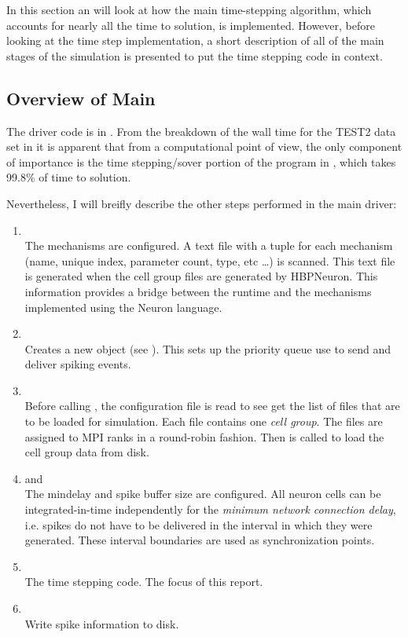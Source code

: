 In this section an will look at how the main time-stepping algorithm, which accounts for nearly all the time to solution, is implemented. However, before looking at the time step implementation, a short description of all of the main stages of the simulation is presented to put the time stepping code in context.
\subsection{Overview of Main}
The driver code is in . From the breakdown of the wall time for the TEST2 data set in  it is apparent that from a computational point of view, the only component of importance is the time stepping/sover portion of the program in , which takes 99.8\% of time to solution.

Nevertheless, I will breifly describe the other steps performed in the main driver:
\begin{enumerate}
\item {}\\
The mechanisms are configured. A text file with a tuple for each mechanism (name, unique index, parameter count, type,  etc \dots) is scanned. This text file is generated when the cell group files are generated by HBPNeuron. This information provides a bridge between the runtime and the mechanisms implemented using the Neuron \hoc language.
\item {}\\
    Creates a new  object (see ). This sets up the priority queue use to send and deliver spiking events.
\item {}\\
    Before calling , the configuration file  is read to see get the list of files that are to be loaded for simulation. Each file contains one \emph{cell group}. The files are assigned to MPI ranks in a round-robin fashion. Then  is called to load the cell group data from disk.
\item {} and \\
    The mindelay and spike buffer size are configured. All neuron cells can be integrated-in-time independently for the \emph{minimum network connection delay}, i.e. spikes do not have to be delivered in the interval in which they were generated. These interval boundaries are used as synchronization points.
\item {} \\
    The time stepping code. The focus of this report.
\item {} \\
    Write spike information to disk.
\end{enumerate}

